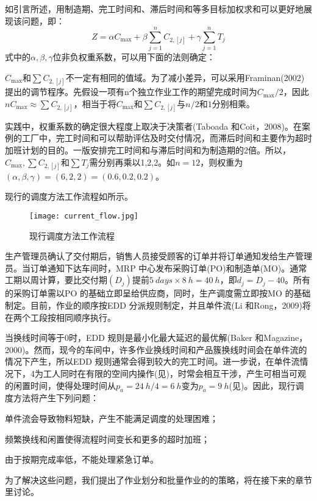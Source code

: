 如引言所述，用制造期、完工时间和、滞后时间和等多目标加权求和可以更好地展现该问题，即：
\[Z=\alpha C_{\max}+\beta\sum_{j=1}^n C_{2,[j]}+\gamma\sum_{j=1}^n T_j
\]
式中的$\alpha,\beta,\gamma$位非负权重系数，可以用下面的法则确定：
\begin{compactenum}[(1)]
\item $C_{\max}$和$\sum C_{2,[j]}$不一定有相同的值域。为了减小差异，可以采用Framinan(2002)提出的调节程序。先假设一项有n个独立作业工作的期望完成时间为$C_{\max}/2$，因此$nC_{\max}\approx\sum C_{2,[j]}$，相当于将$C_{\max}$和$\sum C_{2,[j]}$与$n/2$和$1$分别相乘。
\item 实践中，权重系数的确定很大程度上取决于决策者(Taboada 和Coit，2008)。在案例的工厂中，完工时间和可以帮助评估及时交付情况，而滞后时间和主要作为超时加班计划的目的。一版安排完工时间和与滞后时间和为制造期的2倍。所以，$C_{\max},\sum C_{2,[j]}$和$\sum T_j$需分别再乘以1,2,2。如$n=12$，则权重为$(\alpha,\beta,\gamma)=(6,2,2)=(0.6,0.2,0.2)$。
\end{compactenum}
现行的调度方法工作流程如所示。
\begin{figure}[h]
\centering
\texttt{[image: current\_flow.jpg]}
\caption{现行调度方法工作流程\label{fig:csf}}
\end{figure}
生产管理员确认了交付期后，销售人员接受顾客的订单并将订单通知发给生产管理员。当订单通知下达车间时，MRP 中心发布采购订单(PO)和制造单(MO)。通常工期以周计算，要比交付期$(D_j)$提前$5\ days\times 8\ h=40\ h$，即$d_j=D_j-40$。所有的采购订单需以PO 的基础立即呈给供应商，同时，生产调度需立即按MO 的基础制定。目前，作业的顺序按EDD 分派规则制定，并且单件流(Li 和Rong，2009)将在两个工段按相同顺序执行。

当换线时间等于0时，EDD 规则是最小化最大延迟的最优解(Baker 和Magazine，2000)。然而，现今的车间中，许多作业换线时间和产品簇换线时间会在单件流的情况下产生，所以EDD 规则通常会得到较大的完工时间。进一步说，在单件流情况下，4为工人同时在有限的空间内操作(见)，时常会相互干涉，产生可相当可观的闲置时间，使得处理时间从$p_a=24\ h/4=6\ h$变为$p_a=9\ h$(见)。因此，现行调度方法将产生下列问题：
\begin{compactenum}[(1)]
\item 单件流会导致物料短缺，产生不能满足调度的处理困难；
\item 频繁换线和闲置使得流程时间变长和更多的超时加班；
\item 由于按期完成率低，不能处理紧急订单。
\end{compactenum}

为了解决这些问题，我们提出了作业划分和批量作业的的策略，将在接下来的章节里讨论。